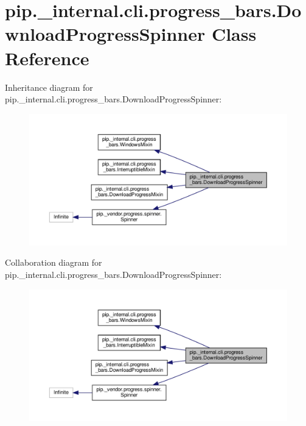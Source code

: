 \hypertarget{classpip_1_1__internal_1_1cli_1_1progress__bars_1_1DownloadProgressSpinner}{}\section{pip.\+\_\+internal.\+cli.\+progress\+\_\+bars.\+Download\+Progress\+Spinner Class Reference}
\label{classpip_1_1__internal_1_1cli_1_1progress__bars_1_1DownloadProgressSpinner}


Inheritance diagram for pip.\+\_\+internal.\+cli.\+progress\+\_\+bars.\+Download\+Progress\+Spinner\+:
\nopagebreak
\begin{figure}[H]
\begin{center}
\leavevmode
\includegraphics[width=350pt]{classpip_1_1__internal_1_1cli_1_1progress__bars_1_1DownloadProgressSpinner__inherit__graph}
\end{center}
\end{figure}


Collaboration diagram for pip.\+\_\+internal.\+cli.\+progress\+\_\+bars.\+Download\+Progress\+Spinner\+:
\nopagebreak
\begin{figure}[H]
\begin{center}
\leavevmode
\includegraphics[width=350pt]{classpip_1_1__internal_1_1cli_1_1progress__bars_1_1DownloadProgressSpinner__coll__graph}
\end{center}
\end{figure}
